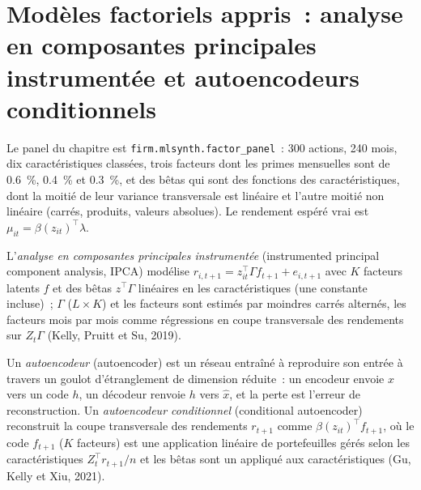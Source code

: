 \section{Modèles factoriels appris~: analyse en composantes principales instrumentée et autoencodeurs conditionnels}

Le panel du chapitre est \texttt{firm.mlsynth.factor\_panel}~: 300 actions, 240 mois, dix caractéristiques classées, trois
facteurs dont les primes mensuelles sont de 0.6~\%, 0.4~\% et 0.3~\%, et des bêtas qui sont des fonctions des caractéristiques, dont la moitié de leur
variance transversale est linéaire et l'autre moitié non linéaire (carrés, produits, valeurs absolues). Le rendement espéré vrai est
$\mu_{it} = \beta(z_{it})^\top\lambda$.

\begin{definition}\label{def:ml:cross-sectional-deep-models:ipca}
L'\emph{analyse en composantes principales instrumentée} (instrumented principal component analysis, IPCA) modélise
$r_{i,t+1} = z_{it}^\top\Gamma f_{t+1} + e_{i,t+1}$ avec $K$ facteurs latents $f$ et des bêtas $z^\top\Gamma$ linéaires en les
caractéristiques (une constante incluse)~; $\Gamma$ ($L\times K$) et les facteurs sont estimés par moindres carrés alternés,
les facteurs mois par mois comme régressions en coupe transversale des rendements sur $Z_t\Gamma$ (Kelly, Pruitt et Su, 2019).
\end{definition}

\begin{definition}\label{def:ml:cross-sectional-deep-models:ae}
Un \emph{autoencodeur} (autoencoder) est un réseau entraîné à reproduire son entrée à travers un
goulot d'étranglement de dimension réduite~: un encodeur envoie $x$ vers un code $h$, un décodeur renvoie $h$ vers $\hat x$, et la perte est l'erreur de reconstruction.
Un \emph{autoencodeur conditionnel} (conditional autoencoder) reconstruit la coupe transversale des rendements $r_{t+1}$ comme
$\beta(z_{it})^\top f_{t+1}$, où le code $f_{t+1}$ ($K$ facteurs) est une application linéaire de portefeuilles
gérés selon les caractéristiques $Z_t^\top r_{t+1}/n$ et les bêtas sont un  appliqué aux caractéristiques (Gu, Kelly et Xiu, 2021).
\end{definition}

